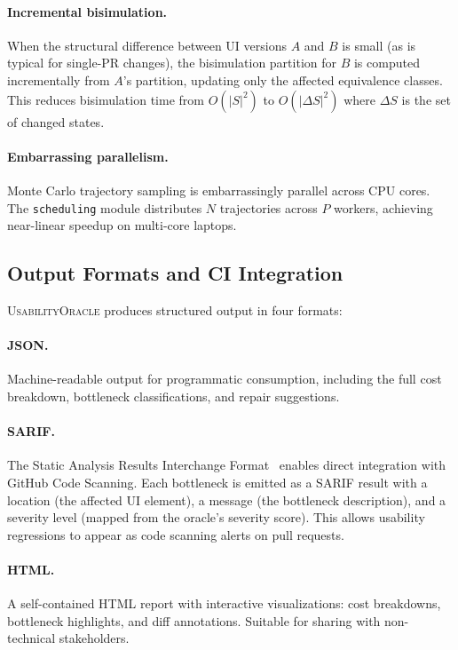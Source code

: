 \documentclass[11pt,twocolumn]{article}
\theoremstyle{definition}
\newcommand{\tool}{\textsc{UsabilityOracle}}
\begin{document}
\paragraph{Incremental bisimulation.}
When the structural difference between UI versions $A$ and $B$ is small (as is typical for single-PR changes), the bisimulation partition for $B$ is computed incrementally from $A$'s partition, updating only the affected equivalence classes.
This reduces bisimulation time from $O(|S|^2)$ to $O(|\Delta S|^2)$ where $\Delta S$ is the set of changed states.

\paragraph{Embarrassing parallelism.}
Monte Carlo trajectory sampling is embarrassingly parallel across CPU cores.
The \texttt{scheduling} module distributes $N$ trajectories across $P$ workers, achieving near-linear speedup on multi-core laptops.

\subsection{Output Formats and CI Integration}

\tool{} produces structured output in four formats:

\paragraph{JSON.}
Machine-readable output for programmatic consumption, including the full cost breakdown, bottleneck classifications, and repair suggestions.

\paragraph{SARIF.}
The Static Analysis Results Interchange Format~\citep{sarif2023} enables direct integration with GitHub Code Scanning.
Each bottleneck is emitted as a SARIF result with a location (the affected UI element), a message (the bottleneck description), and a severity level (mapped from the oracle's severity score).
This allows usability regressions to appear as code scanning alerts on pull requests.

\paragraph{HTML.}
A self-contained HTML report with interactive visualizations: cost breakdowns, bottleneck highlights, and diff annotations.
Suitable for sharing with non-technical stakeholders.
\end{document}
